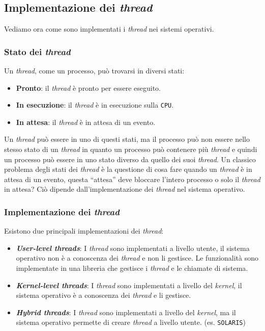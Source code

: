     \subsection{Implementazione dei \textit{thread}}
        Vediamo ora come sono implementati i \textit{thread} nei sistemi operativi.
        \subsubsection{Stato dei \textit{thread}}
            Un \textit{thread}, come un processo, può trovarsi in diversi stati:
            \begin{itemize}
                \item \textbf{Pronto}: il \textit{thread} è pronto per essere eseguito.
                \item \textbf{In esecuzione}: il \textit{thread} è in esecuzione sulla \texttt{CPU}.
                \item \textbf{In attesa}: il \textit{thread} è in attesa di un evento.
            \end{itemize}
            Un \textit{thread} può essere in uno di questi stati, ma il processo può non essere nello stesso stato di un \textit{thread} in quanto un processo può contenere più \textit{thread} e quindi un processo può essere in uno stato diverso da quello dei suoi \textit{thread}.\newline
            Un classico problema degli stati dei \textit{thread} è la questione di cosa fare quando un \textit{thread} è in attesa di un evento, questa ``attesa'' deve bloccare l'intero processo o solo il \textit{thread} in attesa? Ciò dipende dall'implementazione dei \textit{thread} nel sistema operativo.
        \subsubsection{Implementazione dei \textit{thread}}
            Esistono due principali implementazioni dei \textit{thread}:
            \begin{itemize}
                \item \textbf{\textit{User-level threads}}: I \textit{thread} sono implementati a livello utente, il sistema operativo non è a conoscenza dei \textit{thread} e non li gestisce. Le funzionalità sono implementate in una libreria che gestisce i \textit{thread} e le chiamate di sistema.
                \item \textbf{\textit{Kernel-level threads}}: I \textit{thread} sono implementati a livello del \textit{kernel}, il sistema operativo è a conoscenza dei \textit{thread} e li gestisce. 
                \item \textbf{\textit{Hybrid threads}}: I \textit{thread} sono implementati a livello del \textit{kernel}, ma il sistema operativo permette di creare \textit{thread} a livello utente. (es. \texttt{SOLARIS})
            \end{itemize}
